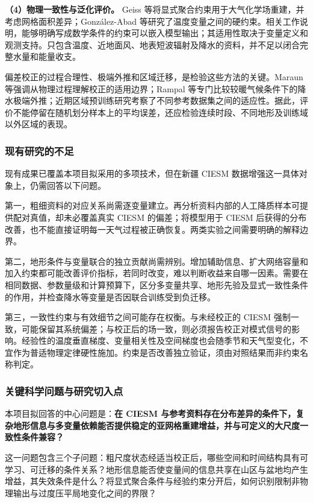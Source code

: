\textbf{（4）物理一致性与泛化评价。}
Geiss 等将显式聚合约束用于大气化学场重建，并考虑网格面积差异\cite{Geiss2022}；González-Abad 等研究了温度变量之间的硬约束\cite{Gonzalez2024Hard}。相关工作说明，能够明确写成数学条件的约束可以嵌入模型输出；其适用性取决于变量定义和观测支持。只包含温度、近地面风、地表短波辐射及降水的资料，并不足以闭合完整水量和能量收支。

偏差校正的过程合理性、极端外推和区域迁移，是检验这些方法的关键。Maraun 等强调从物理过程理解校正的适用边界\cite{Maraun2017}；Rampal 等专门比较较暖气候条件下的降水极端外推\cite{Rampal2024}；近期区域预训练研究考察了不同参考数据集之间的适应性\cite{Pretrain2026}。据此，评价不能停留在随机划分样本上的平均误差，还应检验连续时段、不同地形及训练域以外区域的表现。

\subsubsection{现有研究的不足}

现有成果已覆盖本项目拟采用的多项技术，但在新疆 CIESM 数据增强这一具体对象上，仍需回答以下问题。

第一，粗细资料的对应关系尚需逐变量建立。再分析资料内部的人工降质样本可提供配对真值，却未必覆盖真实 CIESM 的偏差；将模型用于 CIESM 后获得的分布改善，也不能直接证明每一天气过程被正确恢复。两类实验之间需要明确的解释边界。

第二，地形条件与变量联合的独立贡献尚需辨别。增加辅助信息、扩大网络容量和加入约束都可能改善评价指标，若同时改变，难以判断收益来自哪一因素。需要在相同数据、参数量级和计算预算下，区分多变量共享、地形先验及显式一致性条件的作用，并检查降水等变量是否因联合训练受到负迁移。

第三，一致性约束与有效细节之间可能存在权衡。与未经校正的 CIESM 强制一致，可能保留其系统偏差；与校正后的场一致，则必须报告校正对模式信号的影响。经验性的温度垂直梯度、变量相关性及空间梯度也会随季节和天气型变化，不宜作为普适物理定律硬性施加。约束是否改善独立验证，须由对照结果而非约束名称判定。

\subsubsection{关键科学问题与研究切入点}

本项目拟回答的中心问题是：\textbf{在 CIESM 与参考资料存在分布差异的条件下，复杂地形信息与多变量依赖能否提供稳定的亚网格重建增益，并与可定义的大尺度一致性条件兼容？}

这一问题包含三个子问题：粗尺度状态经适当校正后，哪些空间和时间结构具有可学习、可迁移的条件关系？地形信息能否使变量间的信息共享在山区与盆地均产生增益，其失效条件是什么？将显式聚合条件与经验约束分开后，如何识别限制非物理输出与过度压平局地变化之间的界限？

